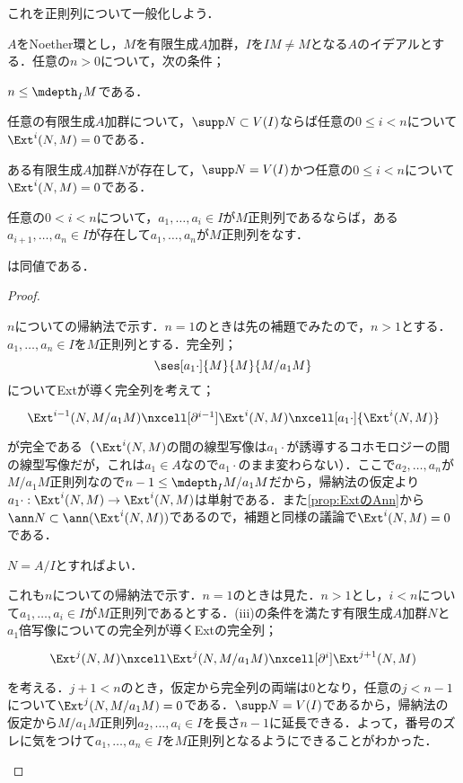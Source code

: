 これを正則列について一般化しよう．

\begin{prop}
	$A$をNoether環とし，$M$を有限生成$A$加群，$I$を$IM\neq M$となる$A$のイデアルとする．任意の$n>0$について，次の条件；
	\begin{sakura}
		\item $n\leq\mdepth_I M$である．
		\item 任意の有限生成$A$加群について，$\supp N\subset V(I)$ならば任意の$0\leq i<n$について$\Ext^i(N,M)=0$である．
		\item ある有限生成$A$加群$N$が存在して，$\supp N=V(I)$かつ任意の$0\leq i<n$について$\Ext^i(N,M)=0$である．
		\item 任意の$0<i<n$について，$a_1,\dots,a_i\in I$が$M$正則列であるならば，ある$a_{i+1},\dots,a_n\in I$が存在して$a_1,\dots,a_n$が$M$正則列をなす．
	\end{sakura}
	は同値である．
\end{prop}

\begin{proof}
	\begin{eqv}[4]
		\item $n$についての帰納法で示す．$n=1$のときは先の補題でみたので，$n>1$とする．$a_1,\dots,a_n\in I$を$M$正則列とする．完全列；
		\[\ses[a_1\cdot]{M}{M}{M/a_1M}\]
		についてExtが導く完全列を考えて；
		\[\begin{tikzcd}{\Ext^{i-1}(N,M/a_1M)}\nxcell[\partial^{i-1}]{\Ext^i(N,M)}\nxcell[a_1\cdot]{\Ext^i(N,M)}\end{tikzcd}\]
		が完全である（$\Ext^i(N,M)$の間の線型写像は$a_1\cdot$が誘導するコホモロジーの間の線型写像だが，これは$a_1\in A$なので$a_1\cdot$のまま変わらない）．ここで$a_2,\dots,a_n$が$M/a_1M$正則列なので$n-1\leq\mdepth_I M/a_1M$だから，帰納法の仮定より$a_1\cdot:\Ext^i(N,M)\to\Ext^i(N,M)$は単射である．また\ref{prop:ExtのAnn}から$\ann N\subset\ann(\Ext^i(N,M))$であるので，補題と同様の議論で$\Ext^i(N,M)=0$である．
		\item $N=A/I$とすればよい．
		\item これも$n$についての帰納法で示す．$n=1$のときは見た．$n>1$とし，$i<n$について$a_1,\dots,a_i\in I$が$M$正則列であるとする．(iii)の条件を満たす有限生成$A$加群$N$と$a_1$倍写像についての完全列が導くExtの完全列；
		\[\begin{tikzcd}
		\Ext^{j}(N,M)\nxcell\Ext^{j}(N,M/a_1M)\nxcell[\partial^i]\Ext^{j+1}(N,M)
		\end{tikzcd}\]
		を考える．$j+1<n$のとき，仮定から完全列の両端は$0$となり，任意の$j<n-1$について$\Ext^j(N,M/a_1M)=0$である．$\supp N=V(I)$であるから，帰納法の仮定から$M/a_1M$正則列$a_2,\dots,a_i\in I$を長さ$n-1$に延長できる．よって，番号のズレに気をつけて$a_1,\dots,a_n\in I$を$M$正則列となるようにできることがわかった．
	\end{eqv}
\end{proof}

